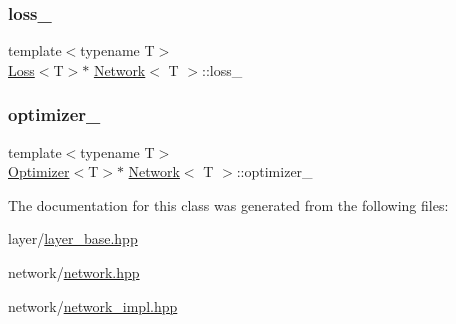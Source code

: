\mbox{\label{class_network_a1445c84bc4a3f14a71e982c1c2bef76d}} 
\subsubsection{\texorpdfstring{loss\_}{loss\_}}
{\footnotesize\ttfamily template$<$typename T$>$ \\
\mbox{\hyperlink{class_loss}{Loss}}$<$T$>$$\ast$ \mbox{\hyperlink{class_network}{Network}}$<$ T $>$\+::loss\+\_\+\hspace{0.3cm}{\ttfamily [protected]}}

\mbox{\label{class_network_a41e9d6851a95074ffec5e66b78deb9b7}} 
\subsubsection{\texorpdfstring{optimizer\_}{optimizer\_}}
{\footnotesize\ttfamily template$<$typename T$>$ \\
\mbox{\hyperlink{class_optimizer}{Optimizer}}$<$T$>$$\ast$ \mbox{\hyperlink{class_network}{Network}}$<$ T $>$\+::optimizer\+\_\+\hspace{0.3cm}{\ttfamily [protected]}}



The documentation for this class was generated from the following files\+:\begin{DoxyCompactItemize}
\item 
layer/\mbox{\hyperlink{layer__base_8hpp}{layer\+\_\+base.\+hpp}}\item 
network/\mbox{\hyperlink{network_8hpp}{network.\+hpp}}\item 
network/\mbox{\hyperlink{network__impl_8hpp}{network\+\_\+impl.\+hpp}}\end{DoxyCompactItemize}

